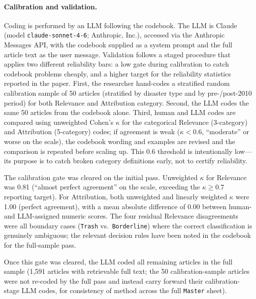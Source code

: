 \documentclass[12pt]{article}
\begin{document}
\paragraph{Calibration and validation.} Coding is performed by an
LLM following the codebook. The LLM is Claude (model
\texttt{claude-sonnet-4-6}; Anthropic, Inc.), accessed via the
Anthropic Messages API, with the codebook supplied as a system prompt
and the full article text as the user message. Validation follows a
staged procedure that applies two different reliability bars: a low
gate during calibration to catch codebook problems cheaply, and a
higher target for the reliability statistics reported in the paper.
First, the researcher hand-codes a stratified random calibration
sample of 50 articles (stratified by disaster type and by
pre-/post-2010 period) for both Relevance and Attribution category.
Second, the LLM codes the same 50 articles from the codebook alone.
Third, human and LLM codes are compared using unweighted Cohen's
$\kappa$ for the categorical Relevance (3-category) and Attribution
(5-category) codes; if agreement is weak ($\kappa < 0.6$,
``moderate'' or worse on the \citet{landiskoch1977} scale), the
codebook wording and examples are revised and the comparison is
repeated before scaling up. This 0.6 threshold is intentionally
low---its purpose is to catch broken category definitions early, not
to certify reliability.

The calibration gate was cleared on the initial pass. Unweighted
$\kappa$ for Relevance was 0.81 (``almost perfect agreement'' on the
\citealt{landiskoch1977} scale, exceeding the $\kappa \geq 0.7$
reporting target). For Attribution, both unweighted and linearly
weighted $\kappa$ were 1.00 (perfect agreement), with a mean absolute
difference of 0.00 between human- and LLM-assigned numeric scores.
The four residual Relevance disagreements were all boundary cases
(\texttt{Trash} vs.\ \texttt{Borderline}) where the correct
classification is genuinely ambiguous; the relevant decision rules
have been noted in the codebook for the full-sample pass.

Once this gate was cleared, the LLM coded all remaining articles in
the full sample (1,591 articles with retrievable full text; the 50
calibration-sample articles were not re-coded by the full pass and
instead carry forward their calibration-stage LLM codes, for
consistency of method across the full \texttt{Master} sheet).
\end{document}
